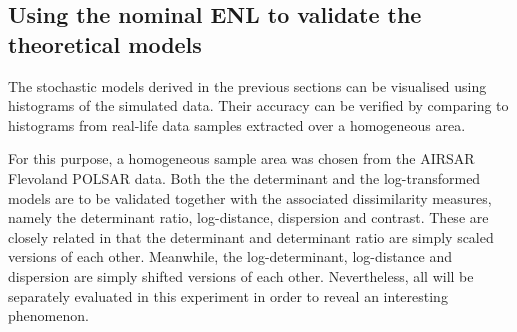 \documentclass[journal]{IEEEtran}
\begin{document}
\subsection{Using the nominal ENL to validate the theoretical models} 
\label{sec:valid_nominal_enl}

The stochastic models derived in the previous sections can be visualised  using histograms of the simulated data.
Their accuracy can be verified by comparing to  histograms from real-life data samples extracted over a homogeneous area.


For this purpose, a homogeneous sample area was chosen from the AIRSAR Flevoland POLSAR data.
Both the the determinant and the log-transformed models are to be validated together with the associated dissimilarity measures, namely the determinant ratio, log-distance, dispersion and contrast.
These are closely related in that the determinant and determinant ratio are simply scaled versions of each other.
Meanwhile, the log-determinant, log-distance and dispersion are simply shifted versions of each other.
Nevertheless, all will be separately evaluated in this experiment in order to reveal an interesting phenomenon.
\end{document}
